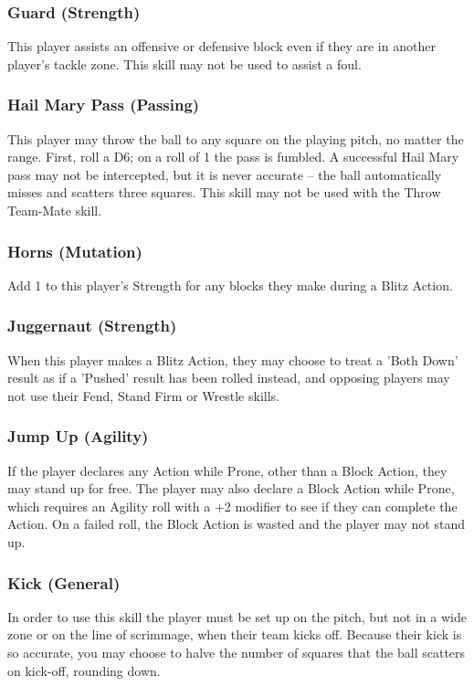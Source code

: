 \documentclass{article}
\begin{document}
\begin{multicols}{3}
\subsubsection{Guard (Strength)}
\par This player assists an offensive or defensive block even if they are in another player's tackle zone. This skill may not be used to assist a foul.

\subsubsection{Hail Mary Pass (Passing)}
\par This player may throw the ball to any square on the playing pitch, no matter the range. First, roll a D6; on a roll of 1 the pass is fumbled. A successful Hail Mary pass may not be intercepted, but it is never accurate – the ball automatically misses and scatters three squares. This skill may not be used with the Throw Team-Mate skill.

\subsubsection{Horns (Mutation)}
\par Add 1 to this player's Strength for any blocks they make during a Blitz Action.

\subsubsection{Juggernaut (Strength)}
\par When this player makes a Blitz Action, they may choose to treat a 'Both Down' result as if a 'Pushed' result has been rolled instead, and opposing players may not use their Fend, Stand Firm or Wrestle skills.

\subsubsection{Jump Up (Agility)}
\par If the player declares any Action while Prone, other than a Block Action, they may stand up for free. The player may also declare a Block Action while Prone, which requires an Agility roll with a +2 modifier to see if they can complete the Action. On a failed roll, the Block Action is wasted and the player may not stand up.

\subsubsection{Kick (General)}
\par In order to use this skill the player must be set up on the pitch, but not in a wide zone or on the line of scrimmage, when their team kicks off. Because their kick is so accurate, you may choose to halve the number of squares that the ball scatters on kick-off, rounding down.


\end{multicols}
\end{document}
